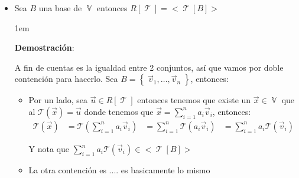 \documentclass[12pt, fleqn]{report}                             %
\newenvironment{SmallIndentation}[1][0.75em]                    %
        {\begin{adjustwidth}{#1}{}\begin{footnotesize}}             %
        {\end{footnotesize}\end{adjustwidth}}                       %
\theoremstyle{break}                                            %
\DeclareMathOperator \VectorSet    {\mathbb{V}}                 %
\DeclareMathOperator \LinealTransformation {\mathcal{T}}        %
\DeclareMathOperator \LinTrans {\mathcal{T}}                    %
\newcommand{\Set}[1]    {\left\{ \; #1 \; \right\}}             %
\newcommand{\Wrap}[1]    {\left( #1 \right)}                    %
\newcommand{\FnLinTrans}[1]{\mathcal{T}\Wrap{#1}}               %
\begin{document}
\begin{itemize}
\begin{SmallIndentation}[1em]
\begin{itemize}
                            \end{itemize}
                        
                        \end{SmallIndentation}


                    \clearpage

                    \item Sea $B$ una base de $\VectorSet$ entonces $R[\LinealTransformation] = <\LinTrans[B]>$ 

                        \begin{SmallIndentation}[1em]
                            \textbf{Demostración}:
                            
                            A fin de cuentas es la igualdad entre 2 conjuntos, así que vamos por doble contención
                            para hacerlo. Sea $B = \Set{\vec v_1, \dots, \vec v_n}$, entonces:

                            \begin{itemize}
                                \item 
                                    Por un lado, sea $\vec u \in R[\LinealTransformation]$ entonces
                                    tenemos que existe un $\vec x \in \VectorSet$ que al $\FnLinTrans{\vec x} = \vec u$
                                    donde tenemos que $\vec x = \sum_{i=1}^n a_i \vec v_i$, entonces:
                                    \begin{align*}
                                        \FnLinTrans{\vec x} 
                                            &= \FnLinTrans{\sum_{i=1}^n a_i \vec v_i} 
                                            &= \sum_{i=1}^n \FnLinTrans{a_i \vec v_i} 
                                            &= \sum_{i=1}^n a_i \FnLinTrans{\vec v_i} 
                                    \end{align*}

                                        Y nota que $\sum_{i=1}^n a_i \FnLinTrans{\vec v_i} \in <\LinTrans[B]>$ 

                               \item
                                La otra contención es .... es basicamente lo mismo

                            \end{itemize}

                        \end{SmallIndentation}

                \end{itemize}
\end{document}
